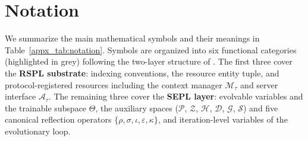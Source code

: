 \section{Notation}
\label{appx_sec:notation}

We summarize the main mathematical symbols and their meanings in Table~\ref{appx_tab:notation}.
Symbols are organized into six functional categories (highlighted in grey) following the two-layer structure of \projectname.
The first three cover the \textbf{RSPL substrate}: indexing conventions, the resource entity tuple, and protocol-registered resources including the context manager $\mathcal{M}_\tau$ and server interface $\mathcal{A}_\tau$.
The remaining three cover the \textbf{SEPL layer}: evolvable variables and the trainable subspace $\Theta$, the auxiliary spaces ($\mathcal{P}$, $\mathcal{Z}$, $\mathcal{H}$, $\mathcal{D}$, $\mathcal{G}$, $\mathcal{S}$) and five canonical reflection operators $\{\rho, \sigma, \iota, \varepsilon, \kappa\}$, and iteration-level variables of the evolutionary loop.

